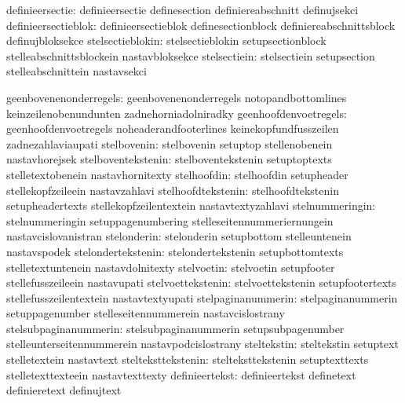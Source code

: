               definieersectie:  definieersectie              definesection
                                definiereabschnitt           definujsekci
          definieersectieblok:  definieersectieblok          definesectionblock
                                definiereabschnittsblock     definujbloksekce
             stelsectieblokin:  stelsectieblokin             setupsectionblock
                                stelleabschnittsblockein     nastavbloksekce
                 stelsectiein:  stelsectiein                 setupsection
                                stelleabschnittein           nastavsekci

       geenbovenenonderregels:  geenbovenenonderregels       notopandbottomlines
                                keinzeilenobenundunten       zadnehorniadolniradky
        geenhoofdenvoetregels:  geenhoofdenvoetregels        noheaderandfooterlines
                                keinekopfundfusszeilen       zadnezahlaviaupati
                  stelbovenin:  stelbovenin                  setuptop
                                stellenobenein               nastavhorejsek
           stelboventekstenin:  stelboventekstenin           setuptoptexts
                                stelletextobenein            nastavhornitexty
                  stelhoofdin:  stelhoofdin                  setupheader
                                stellekopfzeileein           nastavzahlavi
           stelhoofdtekstenin:  stelhoofdtekstenin           setupheadertexts
                                stellekopfzeilentextein      nastavtextyzahlavi
              stelnummeringin:  stelnummeringin              setuppagenumbering
                                stelleseitennummeriernungein nastavcislovanistran
                  stelonderin:  stelonderin                  setupbottom
                                stelleuntenein               nastavspodek
           stelondertekstenin:  stelondertekstenin           setupbottomtexts
                                stelletextuntenein           nastavdolnitexty
                   stelvoetin:  stelvoetin                   setupfooter
                                stellefusszeileein           nastavupati
            stelvoettekstenin:  stelvoettekstenin            setupfootertexts
                                stellefusszeilentextein      nastavtextyupati
           stelpaginanummerin:  stelpaginanummerin           setuppagenumber
                                stelleseitennummerein        nastavcislostrany
        stelsubpaginanummerin:  stelsubpaginanummerin        setupsubpagenumber
                                stelleunterseitennummerein   nastavpodcislostrany
                  steltekstin:  steltekstin                  setuptext
                                stelletextein                nastavtext
           stelteksttekstenin:  stelteksttekstenin           setuptexttexts
                                stelletexttexteein           nastavtexttexty
               definieertekst:  definieertekst               definetext
                                definieretext                definujtext

